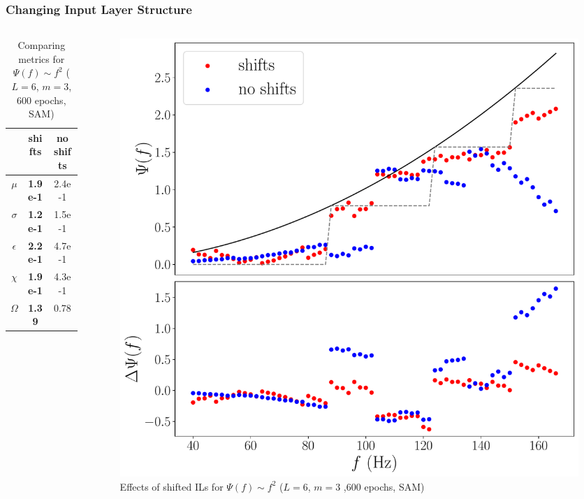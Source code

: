 \documentclass{beamer}
\begin{document}
\begin{frame}
\frametitle{Changing Input Layer Structure}
\begin{columns}
\begin{column}{0.5\textwidth}
\begin{table}
\begin{tabular}{c || c| c }
& shifts & no shifts \\ \hline \hline 
$\mu$ & \textbf{1.9e-1} & 2.4e-1   \\
$\sigma$ & \textbf{1.2e-1} & 1.5e-1  \\
$\epsilon$  & \textbf{2.2e-1} & 4.7e-1 \\
$\chi$ &\textbf{ 1.9e-1} & 4.3e-1 \\ \hline 
$\Omega$ & \textbf{1.39} &  0.78 
\end{tabular}
\caption{Comparing metrics for $\Psi(f) \sim f^2$ ($L=6$, $m=3$, 600 epochs, SAM)}
\end{table}
\end{column}
\begin{column}{0.5\textwidth}
\begin{figure}
\centering 
\includegraphics[width=\textwidth]{im/phase_shift_comp_quadratic_m3}
\caption{Effects of shifted ILs for $\Psi(f) \sim f^2$ ($L=6$, $m=3$ ,600 epochs, SAM)}
\end{figure}
\end{column}
\end{columns}
\end{frame}
\end{document}
